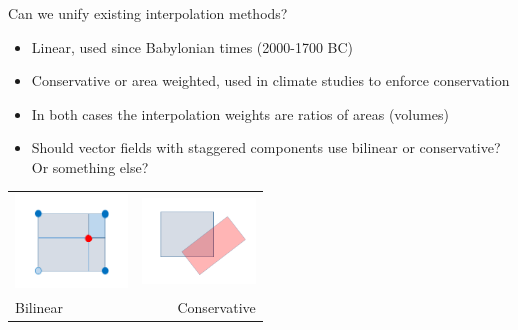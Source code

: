 \documentclass[aspectratio=169]{beamer}
\begin{document}
\begin{frame}[t]
  \frametitle{}
    \begin{block}{Can we unify existing interpolation methods?}
      \begin{itemize}%
	  \item Linear, used since Babylonian times (2000-1700 BC)
      \item Conservative or area weighted, used in climate studies to enforce conservation
      \item In both cases the interpolation weights are ratios of areas (volumes)
      \item Should vector fields with staggered components use bilinear or conservative? Or something else?
    \end{itemize}
  \end{block}
  \begin{tabular}{lr}
      \includegraphics[width=30mm]{bilinear.png} &               \includegraphics[width=30mm]{conservative.png} \\
      {Bilinear} & {Conservative}  
\end{tabular}
\end{frame}
\end{document}
